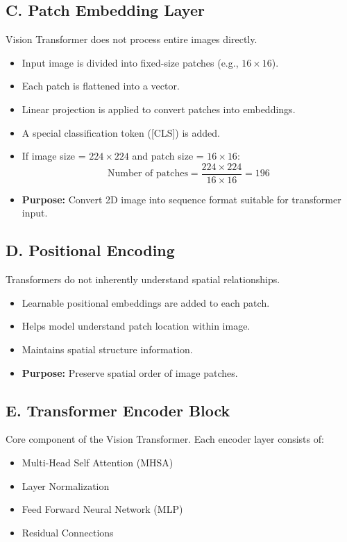 \documentclass[a4paper,12pt]{report}
\begin{document}
    \subsection*{C. Patch Embedding Layer}
    Vision Transformer does not process entire images directly.
    \begin{itemize}
        \item Input image is divided into fixed-size patches (e.g., $16 \times 16$).
        \item Each patch is flattened into a vector.
        \item Linear projection is applied to convert patches into embeddings.
        \item A special classification token ([CLS]) is added.
        \item If image size = $224 \times 224$ and patch size = $16 \times 16$:
        \[ \text{Number of patches} = \frac{224 \times 224}{16 \times 16} = 196 \]
        \item \textbf{Purpose:} Convert 2D image into sequence format suitable for transformer input.
    \end{itemize}

    \subsection*{D. Positional Encoding}
    Transformers do not inherently understand spatial relationships.
    \begin{itemize}
        \item Learnable positional embeddings are added to each patch.
        \item Helps model understand patch location within image.
        \item Maintains spatial structure information.
        \item \textbf{Purpose:} Preserve spatial order of image patches.
    \end{itemize}

    \subsection*{E. Transformer Encoder Block}
    Core component of the Vision Transformer. Each encoder layer consists of:
    \begin{itemize}
        \item Multi-Head Self Attention (MHSA)
        \item Layer Normalization
        \item Feed Forward Neural Network (MLP)
        \item Residual Connections
    \end{itemize}
\end{document}
